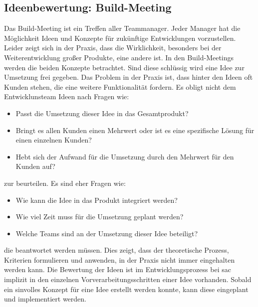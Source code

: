 \subsection{Ideenbewertung: Build-Meeting}
Das Build-Meeting ist ein Treffen aller Teammanager. Jeder Manager hat die Möglichkeit Ideen und Konzepte für zukünftige Entwicklungen 
vorzustellen. 
Leider zeigt sich in der Praxis, dass die Wirklichkeit, besonders bei der Weiterentwicklung großer Produkte, eine andere ist. 
In den Build-Meetings werden die beiden Konzepte betrachtet. Sind diese schlüssig wird eine Idee zur Umsetzung frei gegeben. 
Das Problem in der Praxis ist, dass hinter den Ideen oft Kunden stehen, die eine weitere Funktionalität fordern. Es obligt nicht 
dem Entwicklunsteam Ideen nach Fragen wie: 
\begin{itemize}
    \item Passt die Umsetzung dieser Idee in das Gesamtprodukt?
    \item Bringt es allen Kunden einen Mehrwert oder ist es eine spezifische Lösung für einen einzelnen Kunden?
    \item Hebt sich der Aufwand für die Umsetzung durch den Mehrwert für den Kunden auf?
\end{itemize}
zur beurteilen. Es sind eher Fragen wie: 
\begin{itemize}
    \item Wie kann die Idee in das Produkt integriert werden?
    \item Wie viel Zeit muss für die Umsetzung geplant werden? 
    \item Welche Teams sind an der Umsetzung dieser Idee beteiligt?
\end{itemize}
die beantwortet werden müssen. 
Dies zeigt, dass der theoretische Prozess, Kriterien formulieren und anwenden, in der Praxis nicht immer eingehalten werden kann.
Die Bewertung der Ideen ist im Entwicklungsprozess bei \ac{sac} implizit in den einzelnen Vorverarbeitungsschritten einer Idee vorhanden.
Sobald ein sinvolles Konzept für eine Idee erstellt werden konnte, kann diese eingeplant und implementiert werden.